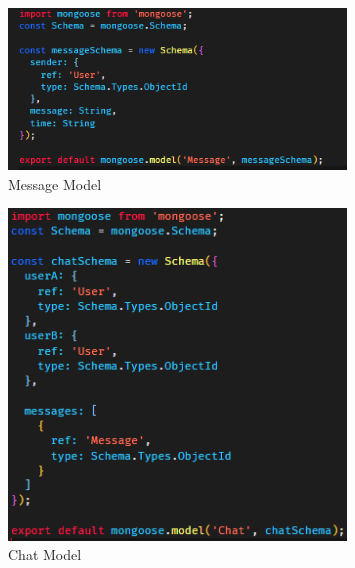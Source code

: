                     \begin{figure}[h]
                        \centering
                        \includegraphics[width=0.8\textwidth]{images/messageModel.png}
                        \caption{Message Model}
                        \label{fig:messageModel}
                    \end{figure}


                    \begin{figure}[h]
                        \centering
                        \includegraphics[width=0.8\textwidth]{images/chatModel.png}
                        \caption{Chat Model}
                        \label{fig:chatModel}
                    \end{figure}


                    \pagebreak
                    \clearpage
                    
